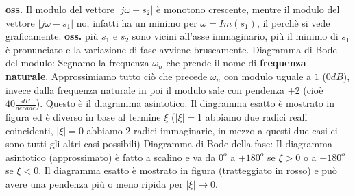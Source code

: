 \begin{itemize}
\begin{itemize}
        \newline
        \newline
        \textbf{oss.} Il modulo del vettore $|j \omega - s_2|$ è monotono crescente, mentre il modulo del vettore $|j \omega - s_1|$ no, infatti ha un minimo per $\omega = Im(s_1)$, il perchè si vede graficamente.\newline
        \newline
        \textbf{oss.} più $s_1$ e $s_2$ sono vicini all'asse immaginario, più il minimo di $s_1$ è pronunciato e la variazione di fase avviene bruscamente.\newline
        \newline
        \newline
        Diagramma di Bode del modulo: Segnamo la frequenza $\omega_n$ che prende il nome di \textbf{frequenza naturale}. Approssimiamo tutto ciò che precede $\omega_n$ con modulo uguale a $1$ ($0dB$), invece dalla frequenza naturale in poi il modulo sale con pendenza $+2$ (cioè $40 \frac{dB}{decade}$). Questo è il diagramma asintotico. Il diagramma esatto è mostrato in figura ed è diverso in base al termine $\xi$ ($|\xi| = 1$ abbiamo due radici reali coincidenti, $|\xi| = 0$ abbiamo $2$ radici immaginarie, in mezzo a questi due casi ci sono tutti gli altri casi possibili)\newline
        \newline
        \newline
        Diagramma di Bode della fase: Il diagramma asintotico (approssimato) è fatto a scalino e va da $0^o$ a $+ 180^o$ se $\xi > 0$ o a $-180^o$ se $\xi < 0$. Il diagramma esatto è mostrato in figura (tratteggiato in rosso) e può avere una pendenza più o meno ripida per $|\xi| \rightarrow 0$.
    \end{itemize} 
\end{itemize}